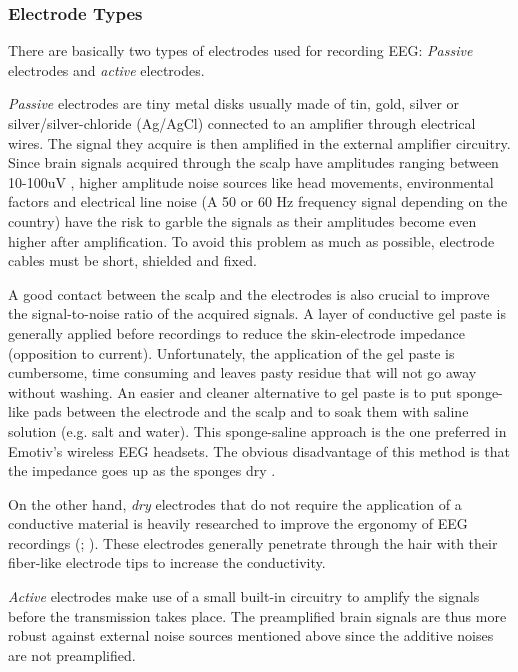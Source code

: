 \documentclass[12pt]{article}
\newcommand\mysubsubsection[1]{\subsubsection{#1}}
\numberwithin{equation}{section}
\numberwithin{figure}{section}
\numberwithin{table}{section}
\begin{document}
\mysubsubsection{Electrode Types}
\par{
    There are basically two types of electrodes used for recording EEG: \emph{Passive} electrodes and
    \emph{active} electrodes.
}
\par{
    \emph{Passive} electrodes are tiny metal disks usually made of tin, gold, silver
    or silver/silver-chloride (Ag/AgCl) connected to an amplifier
    through electrical wires. The signal they acquire is then amplified in the
    external amplifier circuitry. Since brain signals acquired through the scalp
    have amplitudes ranging between 10-100uV \citep{sanei_eeg_2008}, higher amplitude noise sources like
    head movements, environmental factors and electrical line noise (A 50 or 60 Hz
    frequency signal depending on the country) have the risk to garble the signals as their
    amplitudes become even higher after amplification. To avoid this problem as much as
    possible, electrode cables must be short, shielded and fixed.
}
\par{
    A good contact between the scalp and the electrodes is also crucial to
    improve the signal-to-noise ratio of the acquired signals. A layer of conductive
    gel paste is generally applied before recordings to reduce the skin-electrode impedance (opposition to current).
    Unfortunately, the application of the gel paste is cumbersome, time consuming and
    leaves pasty residue that will not go away without washing. An easier and
    cleaner alternative to gel paste is to put sponge-like pads between the
    electrode and the scalp and to soak them with saline solution (e.g. salt and water).
    This sponge-saline approach is the one preferred in Emotiv's wireless
    EEG headsets. The obvious disadvantage of this method is that the impedance
    goes up as the sponges dry \citep{wolpaw_brain-computer_2012}.
}
\par{
    On the other hand, \emph{dry} electrodes
    that do not require the application of a conductive material is heavily
    researched to improve the ergonomy of EEG recordings (\citealp{popescu_single_2007}; \citealp{grozea_bristle-sensorslow-cost_2011}).
    These electrodes generally penetrate through the hair
    with their fiber-like electrode tips to increase the conductivity.
}
\par{
    \emph{Active} electrodes make use of a small built-in circuitry to amplify
    the signals before the transmission takes place. The preamplified brain signals
    are thus more robust against external noise sources mentioned above since
    the additive noises are not preamplified.
}
\end{document}
